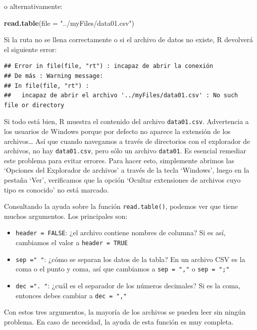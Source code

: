 \documentclass[
]{book}
\newenvironment{Shaded}{\begin{snugshade}}{\end{snugshade}}
\newcommand{\DataTypeTok}[1]{\textcolor[rgb]{0.13,0.29,0.53}{#1}}
\newcommand{\KeywordTok}[1]{\textcolor[rgb]{0.13,0.29,0.53}{\textbf{#1}}}
\newcommand{\NormalTok}[1]{#1}
\newcommand{\StringTok}[1]{\textcolor[rgb]{0.31,0.60,0.02}{#1}}
\providecommand{\tightlist}{%
  \setlength{\itemsep}{0pt}\setlength{\parskip}{0pt}}
\begin{document}
o alternativamente:

\begin{Shaded}
\begin{Highlighting}[]
\KeywordTok{read.table}\NormalTok{(}\DataTypeTok{file =} \StringTok{"../myFiles/data01.csv"}\NormalTok{)}
\end{Highlighting}
\end{Shaded}

Si la ruta no se llena correctamente o si el archivo de datos no existe, R devolverá el siguiente error:

\begin{verbatim}
## Error in file(file, "rt") : incapaz de abrir la conexión
## De más : Warning message:
## In file(file, "rt") :
##   incapaz de abrir el archivo '../myFiles/data01.csv' : No such file or directory
\end{verbatim}

Si todo está bien, R muestra el contenido del archivo \texttt{data01.csv}. Advertencia a los usuarios de Windows porque por defecto no aparece la extensión de los archivos\ldots{} Así que cuando navegamos a través de directorios con el explorador de archivos, no hay \texttt{data01.csv}, pero sólo un archivo \texttt{data01}. Es esencial remediar este problema para evitar errores. Para hacer esto, simplemente abrimos las `Opciones del Explorador de archivos' a través de la tecla `Windows', luego en la pestaña `Ver', verificamos que la opción `Ocultar extensiones de archivos cuyo tipo es conocido' no está marcado.

Consultando la ayuda sobre la función \texttt{read.table()}, podemos ver que tiene muchos argumentos. Los principales son:

\begin{itemize}
\tightlist
\item
  \texttt{header\ =\ FALSE}: ¿el archivo contiene nombres de columna? Si es así, cambiamos el valor a \texttt{header\ =\ TRUE}
\item
  \texttt{sep\ ="\ "}: ¿cómo se separan los datos de la tabla? En un archivo CSV es la coma o el punto y coma, así que cambiamos a \texttt{sep\ =\ ","} o \texttt{sep\ =\ ";"}
\item
  \texttt{dec\ =".\ "}: ¿cuál es el separador de los números decimales? Si es la coma, entonces debes cambiar a \texttt{dec\ =\ ","}
\end{itemize}

Con estos tres argumentos, la mayoría de los archivos se pueden leer sin ningún problema. En caso de necesidad, la ayuda de esta función es muy completa.
\end{document}
